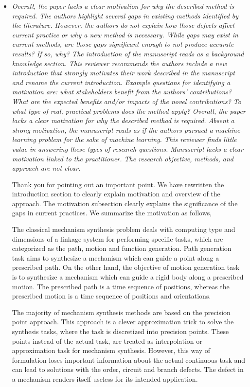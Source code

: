 \documentclass{article}
\begin{document}
\begin{itemize}
  \item \emph{
Overall, the paper lacks a clear motivation for why the described method is required.
The authors highlight several gaps in existing methods identified by the literature.
However, the authors do not explain how those defects affect current practice or why a new method is necessary.
While gaps may exist in current methods, are those gaps significant enough to not produce accurate results? If so, why? The introduction of the manuscript reads as a background knowledge section.
This reviewer recommends the authors include a new introduction that strongly motivates their work described in the manuscript and rename the current introduction.
Example questions for identifying a motivation are: what stakeholders benefit from the authors' contributions? What are the expected benefits and/or impacts of the novel contributions? To what type of real, practical problems does the method apply?
Overall, the paper lacks a clear motivation for why the described method is required.
Absent a strong motivation, the manuscript reads as if the authors pursued a machine-learning problem for the sake of machine learning. This reviewer finds little value in answering these types of research questions.
Manuscript lacks a clear motivation linked to the practitioner.
The research objective, methods, and approach are not clear.
}

Thank you for pointing out an important point.
We have rewritten the introduction section to clearly explain motivation and overview of the approach.
The motivation subsection clearly explains the significance of the gaps in current practices.
We summarize the motivation as follows,

The classical mechanism synthesis problem deals with computing type and dimensions of a linkage system for performing specific tasks, which are categorized as the path, motion and function generation.
Path generation task aims to synthesize a mechanism which can guide a point along a prescribed path.
On the other hand, the objective of motion generation task is to synthesize a mechanism which can guide a rigid body along a prescribed motion.
The prescribed path is a time sequence of positions, whereas the prescribed motion is a time sequence of positions and orientations.

The majority of mechanism synthesis methods are based on the precision point approach.
This approach is a clever approximation trick to solve the synthesis tasks, where the task is discretized into precision points.
These points instead of the actual task, are treated as interpolation or approximation task for mechanism synthesis.
However, this way of formulation loses important information about the actual continuous task and can lead to solutions with the order, circuit and branch defects.
The defect in a mechanism renders itself useless for its intended application.


\end{itemize}
\end{document}
